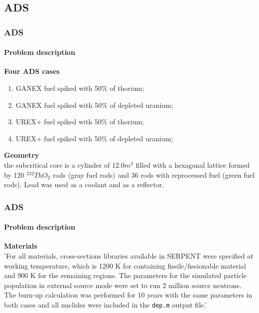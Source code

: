 \documentclass[svgnames,smaller,table]{beamer}
\begin{document}
\subsection{ADS}
\begin{frame}
  \frametitle{ADS}
  \framesubtitle{Problem description}
  \textbf{Four ADS cases}
  \begin{enumerate}
    \item GANEX fuel spiked with 50\% of thorium;
  \item GANEX fuel spiked with 50\% of depleted uranium;
  \item UREX$+$ fuel spiked with 50\% of thorium;
  \item UREX$+$ fuel spiked with 50\% of depleted uranium;
  \end{enumerate}
  \vspace{10px}
  \textbf{Geometry}\\
  the subcritical core is a cylinder of $12.0m^3$ filled with a hexagonal lattice formed by 120 $^{232}ThO_2$ rods (gray fuel rods) and 36 rods with reprocessed fuel (green fuel rods). Lead was used as a coolant and as a reflector.
\end{frame}

\begin{frame}
  \frametitle{ADS}
  \framesubtitle{Problem description}
  \textbf{Materials}\\
  \vspace{10px}
  'For all materials, cross-sections libraries available in SERPENT were specified at working temperature, which is 1200 K for containing fissile/fissionable material and 900 K for the remaining regions. The parameters for the simulated particle population in external source mode were set to run 2 million source neutrons. The burn-up calculation was performed for 10 years with the same parameters in both cases and all nuclides were included in the \texttt{dep.m} output file.'  

\end{frame}
\end{document}
